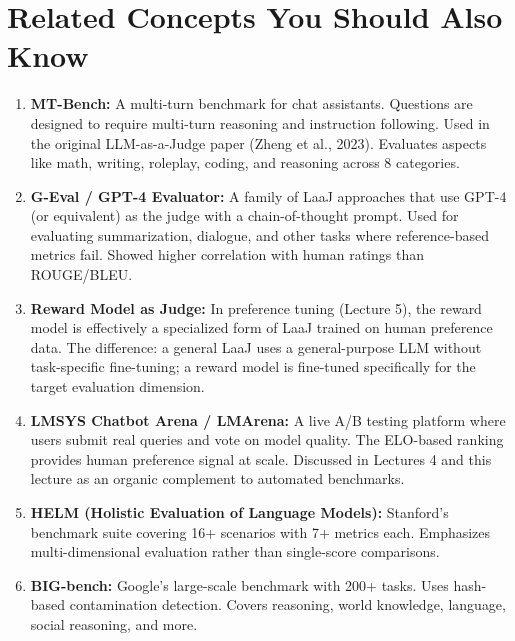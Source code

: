 \documentclass[11pt, a4paper]{article}
\begin{document}
\newpage
\section{Related Concepts You Should Also Know}

\begin{enumerate}[leftmargin=2em]
  \item \textbf{MT-Bench:} A multi-turn benchmark for chat assistants. Questions are designed to require multi-turn reasoning and instruction following. Used in the original LLM-as-a-Judge paper (Zheng et al., 2023). Evaluates aspects like math, writing, roleplay, coding, and reasoning across 8 categories.

  \item \textbf{G-Eval / GPT-4 Evaluator:} A family of LaaJ approaches that use GPT-4 (or equivalent) as the judge with a chain-of-thought prompt. Used for evaluating summarization, dialogue, and other tasks where reference-based metrics fail. Showed higher correlation with human ratings than ROUGE/BLEU.

  \item \textbf{Reward Model as Judge:} In preference tuning (Lecture 5), the reward model is effectively a specialized form of LaaJ trained on human preference data. The difference: a general LaaJ uses a general-purpose LLM without task-specific fine-tuning; a reward model is fine-tuned specifically for the target evaluation dimension.

  \item \textbf{LMSYS Chatbot Arena / LMArena:} A live A/B testing platform where users submit real queries and vote on model quality. The ELO-based ranking provides human preference signal at scale. Discussed in Lectures 4 and this lecture as an organic complement to automated benchmarks.

  \item \textbf{HELM (Holistic Evaluation of Language Models):} Stanford's benchmark suite covering 16+ scenarios with 7+ metrics each. Emphasizes multi-dimensional evaluation rather than single-score comparisons.

  \item \textbf{BIG-bench:} Google's large-scale benchmark with 200+ tasks. Uses hash-based contamination detection. Covers reasoning, world knowledge, language, social reasoning, and more.


\end{enumerate}
\end{document}
